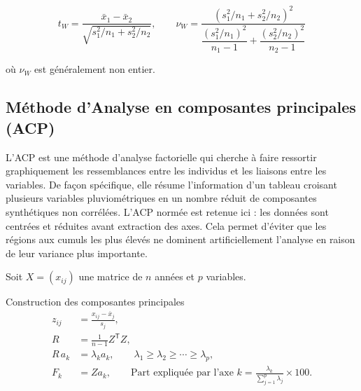 \documentclass[12pt,a4paper]{report}
\begin{document}
\[
t_W = \frac{\bar{x}_1-\bar{x}_2}{\sqrt{s_1^2/n_1+s_2^2/n_2}}, \qquad
\nu_W = \frac{(s_1^2/n_1+s_2^2/n_2)^2}{\dfrac{(s_1^2/n_1)^2}{n_1-1}+\dfrac{(s_2^2/n_2)^2}{n_2-1}}
\]

où $\nu_W$ est généralement non entier.


\subsection{Méthode d'Analyse en composantes principales (ACP)}

L’ACP est une méthode d’analyse factorielle qui cherche à faire ressortir graphiquement les ressemblances entre les individus et les liaisons entre les variables. De façon spécifique, elle résume l'information d'un tableau croisant plusieurs variables pluviométriques en un nombre réduit de composantes synthétiques non corrélées. L’ACP normée est retenue ici : les données sont centrées et réduites avant extraction des axes. Cela permet d'éviter que les régions aux cumuls les plus élevés ne dominent artificiellement l'analyse en raison de leur variance plus importante.

Soit $X=(x_{ij})$ une matrice de $n$ années et $p$ variables.

\begingroup
\small
\setlength{\jot}{1pt}
\setlength{\abovedisplayskip}{5pt}
\setlength{\belowdisplayskip}{5pt}
\begin{formulabox}[0.80\linewidth]{Construction des composantes principales}
\begin{align}
z_{ij}&=\frac{x_{ij}-\overline{x}_j}{s_j},
\label{eq:acp-standardisation}\\[0.5mm]
R&=\frac{1}{n-1}Z^{\mathsf T}Z,
\label{eq:acp-correlation}\\[0.5mm]
R\,a_k&=\lambda_k a_k,
\qquad \lambda_1\geq\lambda_2\geq\cdots\geq\lambda_p,
\label{eq:acp-valeurs-propres}\\[0.5mm]
F_k&=Za_k,
\qquad
\text{Part expliquée par l'axe }k
=\frac{\lambda_k}{\sum_{j=1}^{p}\lambda_j}\times100.
\label{eq:acp-composante}
\end{align}
\end{formulabox}
\endgroup
\end{document}
